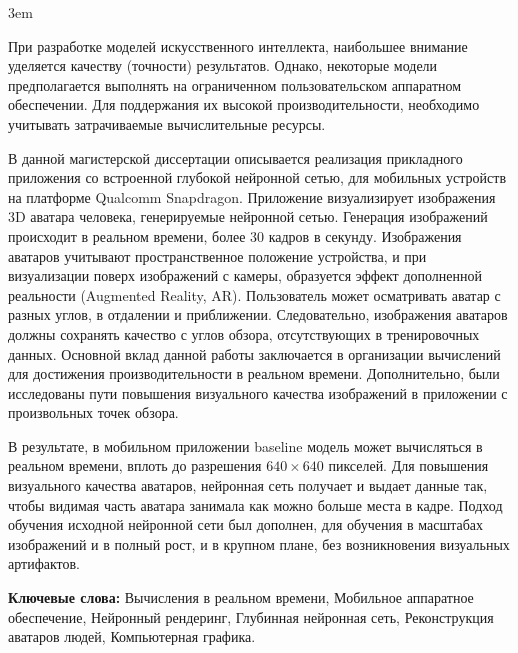 \emergencystretch 3em
\par
При разработке моделей искусственного интеллекта, наибольшее внимание уделяется качеству (точности) результатов. Однако, некоторые модели предполагается выполнять на ограниченном пользовательском аппаратном обеспечении. Для поддержания их высокой производительности, необходимо учитывать затрачиваемые вычислительные ресурсы.

\par
В данной магистерской диссертации описывается реализация прикладного приложения со встроенной глубокой нейронной сетью, для мобильных устройств на платформе Qualcomm Snapdragon. Приложение визуализирует изображения 3D аватара человека, генерируемые нейронной сетью. Генерация изображений происходит в реальном времени, более 30 кадров в секунду. Изображения аватаров учитывают пространственное положение устройства, и при визуализации поверх изображений с камеры, образуется эффект дополненной реальности (Augmented Reality, AR). Пользователь может осматривать аватар с разных углов, в отдалении и приближении. Следовательно, изображения аватаров должны сохранять качество с углов обзора, отсутствующих в тренировочных данных. Основной вклад данной работы заключается в организации вычислений для достижения производительности в реальном времени. Дополнительно, были исследованы пути повышения визуального качества изображений в приложении с произвольных точек обзора.	

\par
В результате, в мобильном приложении baseline модель \cite{model:stylepeople21} может вычисляться в реальном времени, вплоть до разрешения $640\times640$ пикселей. Для повышения визуального качества аватаров, нейронная сеть получает и выдает данные так, чтобы видимая часть аватара занимала как можно больше места в кадре. Подход обучения исходной нейронной сети был дополнен, для обучения в масштабах изображений и в полный рост, и в крупном плане, без возникновения визуальных артифактов. 

\par
\textbf{Ключевые слова:} Вычисления в реальном времени, Мобильное аппаратное обеспечение, Нейронный рендеринг, Глубинная нейронная сеть, Реконструкция аватаров людей, Компьютерная графика.  
